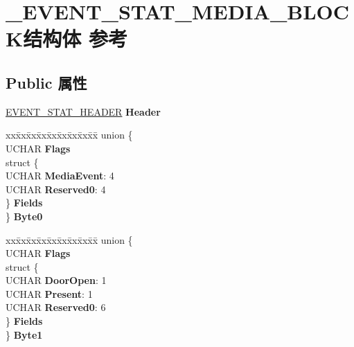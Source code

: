 \hypertarget{struct___e_v_e_n_t___s_t_a_t___m_e_d_i_a___b_l_o_c_k}{}\section{\+\_\+\+E\+V\+E\+N\+T\+\_\+\+S\+T\+A\+T\+\_\+\+M\+E\+D\+I\+A\+\_\+\+B\+L\+O\+C\+K结构体 参考}
\label{struct___e_v_e_n_t___s_t_a_t___m_e_d_i_a___b_l_o_c_k}
\subsection*{Public 属性}
\begin{DoxyCompactItemize}
\item 
\mbox{\label{struct___e_v_e_n_t___s_t_a_t___m_e_d_i_a___b_l_o_c_k_a636bcf29c815007d6f710f89b37e5735}} 
\hyperlink{struct___e_v_e_n_t___s_t_a_t___h_e_a_d_e_r}{E\+V\+E\+N\+T\+\_\+\+S\+T\+A\+T\+\_\+\+H\+E\+A\+D\+ER} {\bfseries Header}
\item 
\mbox{\label{struct___e_v_e_n_t___s_t_a_t___m_e_d_i_a___b_l_o_c_k_af38e3b39e661ebc3b0645472a1a06225}} 
\begin{tabbing}
xx\=xx\=xx\=xx\=xx\=xx\=xx\=xx\=xx\=\kill
union \{\\
\>UCHAR {\bfseries Flags}\\
\>struct \{\\
\>\>UCHAR {\bfseries MediaEvent}: 4\\
\>\>UCHAR {\bfseries Reserved0}: 4\\
\>\} {\bfseries Fields}\\
\} {\bfseries Byte0}\\

\end{tabbing}\item 
\mbox{\label{struct___e_v_e_n_t___s_t_a_t___m_e_d_i_a___b_l_o_c_k_a9cf7d5720128adf8225a75ab8dec85eb}} 
\begin{tabbing}
xx\=xx\=xx\=xx\=xx\=xx\=xx\=xx\=xx\=\kill
union \{\\
\>UCHAR {\bfseries Flags}\\
\>struct \{\\
\>\>UCHAR {\bfseries DoorOpen}: 1\\
\>\>UCHAR {\bfseries Present}: 1\\
\>\>UCHAR {\bfseries Reserved0}: 6\\
\>\} {\bfseries Fields}\\
\} {\bfseries Byte1}\\


\end{tabbing}
\end{DoxyCompactItemize}
